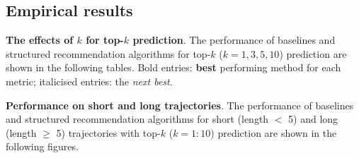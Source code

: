 
\clearpage
\subsection{Empirical results}

\textbf{The effects of $k$ for top-$k$ prediction}.
The performance of baselines and structured recommendation algorithms for top-$k$ ($k=1,3,5,10$) 
prediction are shown in the following tables.
Bold entries: \textbf{best} performing method for each metric; italicised entries: the \textit{next best}. 




\clearpage

\textbf{Performance on short and long trajectories}.
The performance of baselines and structured recommendation algorithms 
for short (length $<$ 5) and long (length $\ge$ 5) trajectories 
with top-$k$ ($k=1:10$) prediction are shown in the following figures.

%

